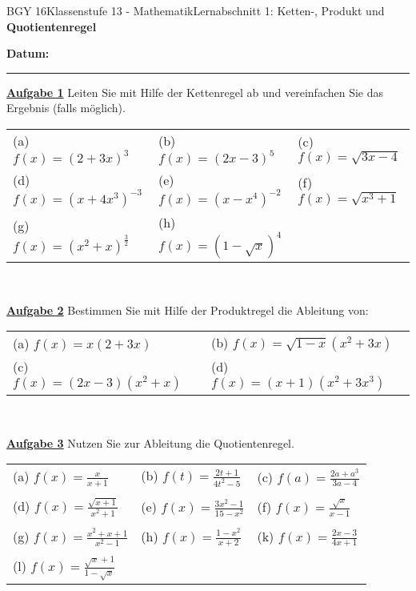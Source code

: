 \documentclass[oneside,openany,headings=optiontotoc,11pt,numbers=noenddot]{scrreprt}
\begin{document}
	\begin{worksheet}{BGY 16}{Klassenstufe 13 - Mathematik}{Lernabschnitt 1: Ketten-, Produkt und \textbf{Quotientenregel}}
				
		\noindent
		\sffamily
		\textbf{Datum:}
		\rule{0.91\textwidth}{0.4pt}
		\begin{framed}
			\noindent
			\textbf{\underline{Aufgabe 1}} Leiten Sie mit Hilfe der Kettenregel ab und vereinfachen Sie das Ergebnis (falls möglich).\\
			\par
			\begin{tabularx}{\textwidth}{lll}
				(a) \(f(x)=(2+3x)^3\) & (b) \(f(x) = (2x-3)^5\) & (c) \(f(x) = \sqrt{3x-4}\)\\
				(d) \(f(x) = (x+4x^3)^{-3}\) & (e) \(f(x) = (x-x^4)^{-2}\) & (f) \(f(x) = \sqrt{x^3+1}\)\\
				(g) \(f(x) = (x^2+x)^{\frac{3}{2}}\) & (h) \(f(x) = (1-\sqrt{x})^4\)
			\end{tabularx}\\
			\par\noindent
			\textbf{\underline{Aufgabe 2}} Bestimmen Sie mit Hilfe der Produktregel die Ableitung von:\\
			\par\noindent
			\begin{tabularx}{\textwidth}{ll}
				(a) \(f(x) = x(2+3x)\) & (b) \(f(x) = \sqrt{1-x}(x^2+3x)\)\\
				(c) \(f(x) = (2x-3)(x^2+x)\) & (d) \(f(x) = (x+1)(x^2+3x^3)\)
			\end{tabularx}\\
			\par\noindent
			\textbf{\underline{Aufgabe 3}} Nutzen Sie zur Ableitung die Quotientenregel.\\
			\par
			\begin{tabularx}{\textwidth}{XXX}
				(a) \(f(x) = \frac{x}{x+1}\) & (b) \(f(t) = \frac{2t+1}{4t^2-5}\) & (c) \(f(a) = \frac{2a + a^3}{3a-4}\)\\
				\\
				(d) \(f(x) = \frac{\sqrt{x+1}}{x^2+1}\) & (e) \(f(x) = \frac{3x^2-1}{15-x^2}\) & (f) \(f(x) = \frac{\sqrt{x}}{x-1}\)\\
				\\
				(g) \(f(x) = \frac{x^2+x+1}{x^2-1}\) & (h) \(f(x) = \frac{1-x^2}{x+2}\) & (k) \(f(x) = \frac{2x-3}{4x+1}\)\\
				\\
				(l) \(f(x) = \frac{\sqrt{x}+1}{1-\sqrt{x}}\)
			\end{tabularx}\\
		\end{framed}
	\end{worksheet}
\end{document}
